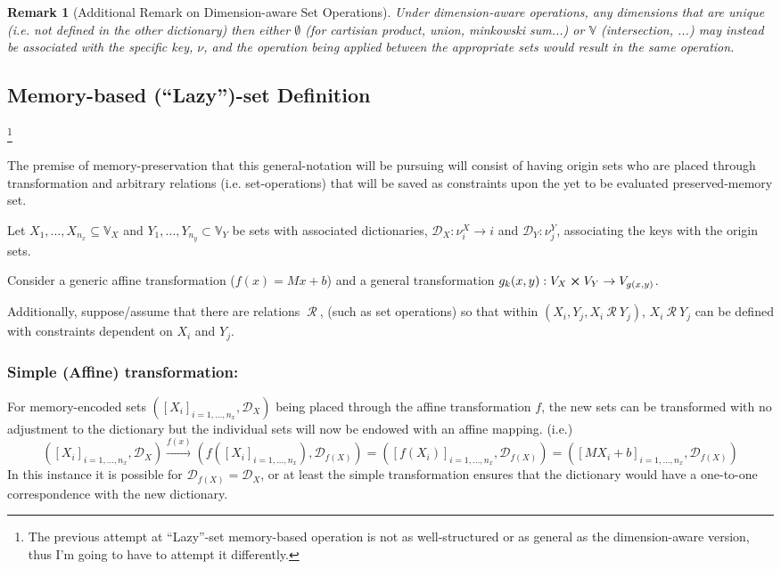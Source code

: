 \documentclass[11pt]{article}
\newtheorem{remark}{Remark}
\newcommand{\Rel}{\ \mathcal{R} \ }
\newcommand{\V}{\mathbb{V}} %
\newcommand{\Key}{\nu} %
\newcommand{\Dict}{\mathcal{D}} %
\begin{document}
\begin{remark}[Additional Remark on Dimension-aware Set Operations]
	Under dimension-aware operations, any dimensions that are unique (i.e. not defined in the other dictionary) then either $\emptyset$ (for cartisian product, union, minkowski sum...) or $\V$ (intersection, ...) may instead be associated with the specific key, $\Key$, and the operation being applied between the appropriate sets would result in the same operation.
\end{remark}


\subsection{Memory-based (``Lazy'')-set Definition}
\footnote{The previous attempt at ``Lazy''-set memory-based operation is not as well-structured or as general as the dimension-aware version, thus I'm going to have to attempt it differently.}

The premise of memory-preservation that this general-notation will be pursuing will consist of having origin sets who are placed through transformation and arbitrary relations (i.e. set-operations) that will be saved as constraints upon the yet to be evaluated preserved-memory set.

Let $X_{1},\dots,X_{n_x} \subseteq \V_{X}$ and $Y_{1},\dots,Y_{n_y} \subset \V_{Y}$ be sets with associated dictionaries, $\Dict_{X} : \Key^{X}_{i} \to i$ and $\Dict_{Y} : \Key^{Y}_{j}$, associating the keys with the origin sets.

Consider a generic affine transformation ($f(x) = Mx + b$) and a general transformation $g_{k}(x,y) : V_{X} \cross V_{Y} \to V_{g(x,y)}$.

Additionally, suppose/assume that there are relations $\Rel$, (such as set operations) so that within $(X_{i}, Y_{j}, X_{i} \Rel Y_{j})$, $X_{i} \Rel Y_{j}$ can be defined with constraints dependent on $X_{i}$ and $Y_{j}$.

\subsubsection{Simple (Affine) transformation:}
For memory-encoded sets $([X_{i}]_{i=1,\dots,n_x},\Dict_{X})$ being placed through the affine transformation $f$, the new sets can be transformed with no adjustment to the dictionary but the individual sets will now be endowed with an affine mapping.
(i.e.)\[
	([X_{i}]_{i=1,\dots,n_x},\Dict_{X}) 
	\overset{f(x)}{\rightarrow} 
	(f([X_{i}]_{i=1,\dots,n_x}),\Dict_{f(X)})
	= ([f(X_{i})]_{i=1,\dots,n_x},\Dict_{f(X)})
	= ([M X_{i} + b]_{i=1,\dots,n_x},\Dict_{f(X)})
\]
In this instance it is possible for $\Dict_{f(X)} = \Dict_{X}$, or at least the simple transformation ensures that the dictionary would have a one-to-one correspondence with the new dictionary.
\end{document}
